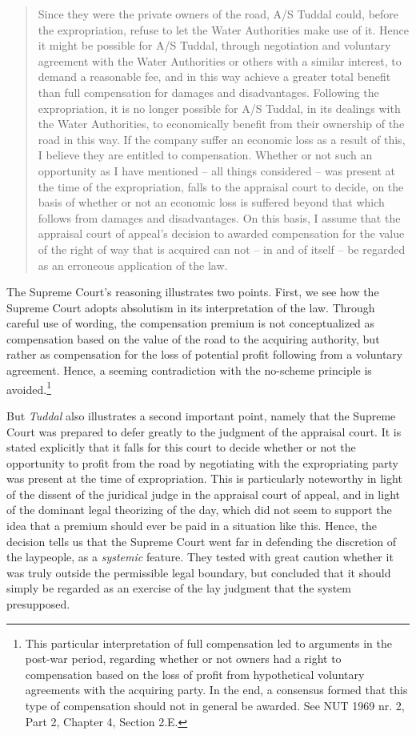 \begin{quote}
Since they were the private owners of the road, A/S Tuddal could, before the expropriation, refuse to let the Water Authorities make use of it. Hence it might be possible for A/S Tuddal, through negotiation and voluntary agreement with the Water Authorities or others with a similar interest, to demand a reasonable fee, and in this way achieve a greater total benefit than full compensation for damages and disadvantages. Following the expropriation, it is no longer possible for A/S Tuddal, in its dealings with the Water Authorities, to economically benefit from their ownership of the road in this way. If the company suffer an economic loss as a result of this, I believe they are entitled to compensation. Whether or not such an opportunity as I have mentioned -- all things considered -- was present at the time of the expropriation, falls to the appraisal court to decide, on the basis of whether or not an economic loss is suffered beyond that which follows from damages and disadvantages. On this basis, I assume that the appraisal court of appeal's decision to awarded compensation for the value of the right of way that is acquired can not -- in and of itself -- be regarded as an erroneous application of the law.
\end{quote}

The Supreme Court's reasoning illustrates two points. First, we see how the Supreme Court adopts absolutism in its interpretation of the law. Through careful use of wording, the compensation premium is not conceptualized as compensation based on the value of the road to the acquiring authority, but rather as compensation for the loss of potential profit following from a voluntary agreement. Hence, a seeming contradiction with the no-scheme principle is avoided.\footnote{This particular interpretation of full compensation led to arguments in the post-war period, regarding whether or not owners had a right to compensation based on the loss of profit from hypothetical voluntary agreements with the acquiring party. In the end, a consensus formed that this type of compensation should not in general be awarded. See NUT 1969 nr. 2, Part 2, Chapter 4, Section 2.E.}

But {\it Tuddal} also illustrates a second important point, namely that the Supreme Court was prepared to defer greatly to the judgment of the appraisal court. It is stated explicitly that it falls for this court to decide whether or not the opportunity to profit from the road by negotiating with the expropriating party was present at the time of expropriation. This is particularly noteworthy in light of the dissent of the juridical judge in the appraisal court of appeal, and in light of the dominant legal theorizing of the day, which did  not seem to support the idea that a premium should ever be paid in a situation like this. Hence, the decision tells us that the Supreme Court went far in defending the discretion of the laypeople, as a \emph{systemic} feature. They tested with great caution whether it was truly outside the permissible legal boundary, but concluded that it should simply be regarded as an exercise of the lay judgment that the system presupposed.

